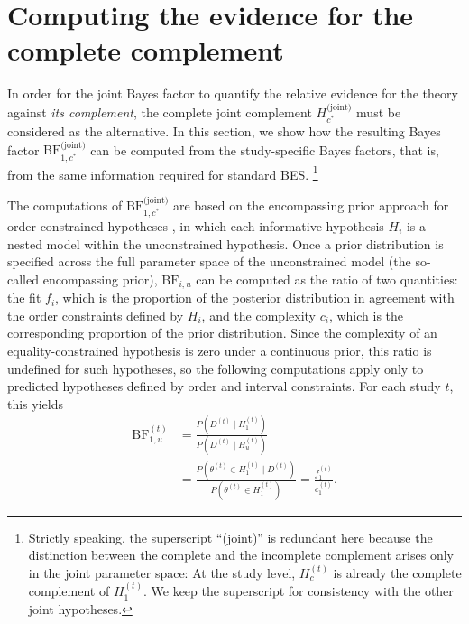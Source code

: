 \documentclass[letterpaper,11pt,oneside]{article}
\begin{document}

\section{Computing the evidence for the complete complement}
\label{sec:compute-complete-complement}

In order for the joint Bayes factor to quantify the relative evidence for the theory against \textit{its complement}, the complete joint complement $H_{c^{*}}^{\text{(joint)}}$ must be considered as the alternative. In this section, we show how the resulting Bayes factor $\mathrm{BF}_{1,c^{*}}^{\text{(joint)}}$ can be computed from the study-specific Bayes factors, that is, from the same information required for standard BES.%
    \footnote{Strictly speaking, the superscript ``(joint)'' is redundant here because the distinction between the complete and the incomplete complement arises only in the joint parameter space: At the study level, $H_c^{(t)}$ is already the complete complement of $H_1^{(t)}$. We keep the superscript for consistency with the other joint hypotheses.}

The computations of $\mathrm{BF}_{1,c^{*}}^{\text{(joint)}}$ are based on the encompassing prior approach for order-constrained hypotheses \parencite{klugkistBayesianModelSelection2005, klugkistBayesFactorInequality2007}, in which each informative hypothesis $H_i$ is a nested model within the unconstrained hypothesis. Once a prior distribution is specified across the full parameter space of the unconstrained model (the so-called encompassing prior), $\mathrm{BF}_{i,u}$ can be computed as the ratio of two quantities: the fit $f_i$, which is the proportion of the posterior distribution in agreement with the order constraints defined by $H_i$, and the complexity $c_i$, which is the corresponding proportion of the prior distribution. Since the complexity of an equality-constrained hypothesis is zero under a continuous prior, this ratio is undefined for such hypotheses, so the following computations apply only to predicted hypotheses defined by order and interval constraints. For each study $t$, this yields
\begin{align}
\mathrm{BF}_{1,u}^{(t)}
&= \frac{P\left(D^{(t)} \mid H_1^{(t)}\right)}
        {P\left(D^{(t)} \mid H_u^{(t)}\right)}\nonumber \\
&= \frac{P\left(\theta^{(t)} \in H_1^{(t)} \mid D^{(t)}\right)}
        {P\left(\theta^{(t)} \in H_1^{(t)}\right)}
= \frac{f_1^{(t)}}{c_1^{(t)}}. 
\label{eq:bf-1u-t}
\end{align}
\end{document}
